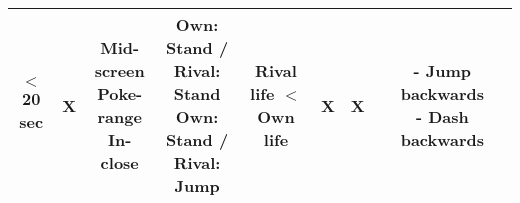 \documentclass{article}
\begin{document}
\begin{landscape}
\begin{table}[h!]
\begin{center}
\begin{tabular*}{24cm}{c|c|c|c|c|c|c|c|c|c}
      \hline
      $<$ 20 sec & X & \makecell{Mid-screen \\ Poke-range \\ In-close} & \makecell{Own: Stand / Rival: Stand \\ Own: Stand / Rival: Jump} & Rival life $<$ Own life & X & X & & \makecell{- Jump backwards \\ - Dash backwards}\\
      \hline
  \end{tabular*}
  \end{center}
\end{table}

\end{landscape}

\newpage

\begin{landscape}


\end{landscape}
\end{document}
